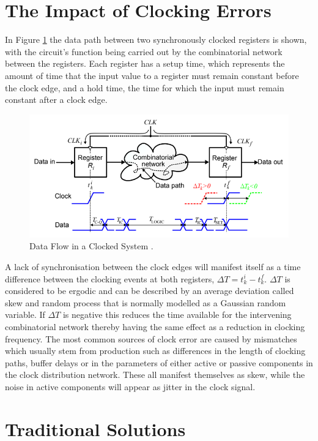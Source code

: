 \documentclass[12pt,english,british]{report}
\begin{document}
\section{The Impact of Clocking Errors}

In Figure \ref{fig:eldar_why_precise_clocking} the data path between two synchronously clocked registers is shown, with the circuit's function being carried out by the combinatorial network between the registers.
Each register has a setup time, which represents the amount of time that the input value to a register must remain constant before the clock edge, and a hold time, the time for which the input must remain constant after a clock edge.
\begin{figure}[h]
	\centering
	\includegraphics[scale=0.5]{../eldar_why_precise_clocking}
	\caption{Data Flow in a Clocked System \cite{zianbetov2013distributed}.}
	\label{fig:eldar_why_precise_clocking}
\end{figure}\newline
A lack of synchronisation between the clock edges will manifest itself as a time difference between the clocking events at both registers, $\Delta T = t^i_k - t^f_k$. $\Delta T$ is considered to be ergodic and can be described by an average deviation called skew and random process that is normally modelled as a Gaussian random variable. If $\Delta T$ is negative this reduces the time available for the intervening combinatorial network thereby having the same effect as a reduction in clocking frequency.
The most common sources of clock error are caused by mismatches which usually stem from production such as differences in the length of clocking paths, buffer delays or in the parameters of either active or passive components in the clock distribution network. These all manifest themselves as skew, while the noise in active components will appear as jitter in the clock signal.

\section{Traditional Solutions}
\end{document}
